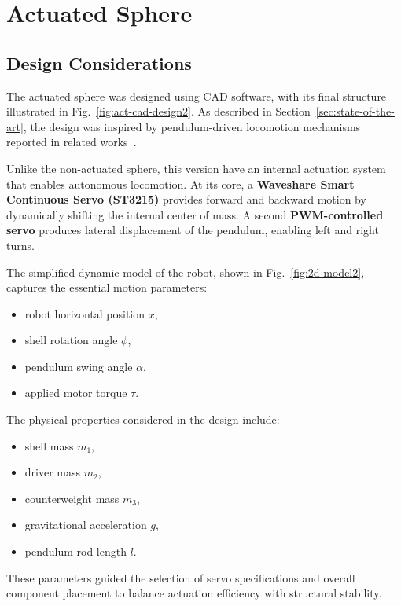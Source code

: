 \documentclass[english, bachelor, utf8]{base/thesis_telematics}
\begin{document}
\section{Actuated Sphere}
\subsection{Design Considerations}
The actuated sphere was designed using CAD software, with its final structure illustrated in Fig.~\ref{fig:act-cad-design2}. As described in Section~\ref{sec:state-of-the-art}, the design was inspired by pendulum-driven locomotion mechanisms reported in related works~\cite{roboball, novelsphere}.  

Unlike the non-actuated sphere, this version have an internal actuation system that enables autonomous locomotion.
At its core, a \textbf{Waveshare Smart Continuous Servo (ST3215)} provides forward and backward motion by dynamically shifting the internal center of mass. 
A second \textbf{PWM-controlled servo} produces lateral displacement of the pendulum, enabling left and right turns.  



The simplified dynamic model of the robot, shown in Fig.~\ref{fig:2d-model2}, captures the essential motion parameters:  
\begin{itemize}
    \item robot horizontal position \( x \),  
    \item shell rotation angle \( \phi \),  
    \item pendulum swing angle \( \alpha \),  
    \item applied motor torque \( \tau \).  
\end{itemize}

The physical properties considered in the design include:  
\begin{itemize}
    \item shell mass \( m_1 \),  
    \item driver mass \( m_2 \),  
    \item counterweight mass \( m_3 \),  
    \item gravitational acceleration \( g \),  
    \item pendulum rod length \( l \).  
\end{itemize}

These parameters guided the selection of servo specifications and overall component placement to balance actuation efficiency with structural stability.  
\end{document}
